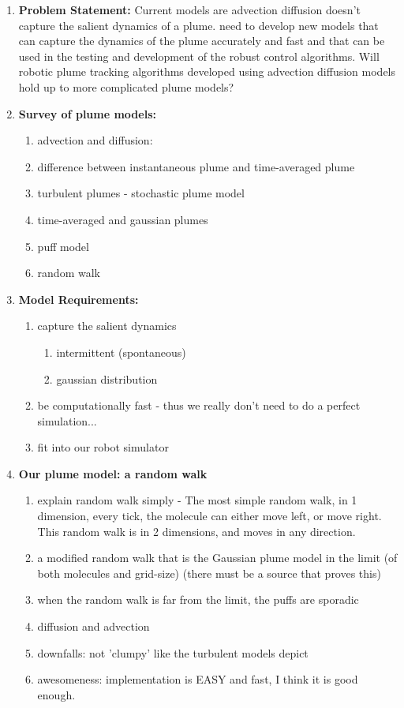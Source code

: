 \documentclass[11pt]{article} %
\begin{document}
\begin{enumerate}

\item {\bf Problem Statement:} Current models are advection diffusion doesn't capture the salient dynamics of a plume.   need to develop new models that can capture the dynamics of the plume accurately and fast and that can be used in the testing and development of the robust control algorithms.   Will robotic plume tracking algorithms developed using advection diffusion models hold up to more complicated plume models?

\item {\bf  Survey of plume models:} %
\begin{enumerate}
	\item advection  and diffusion: 
	\item difference between instantaneous plume and time-averaged plume
	\item turbulent plumes - stochastic plume model
	\item time-averaged and gaussian plumes
	\item puff model
	\item random walk
\end{enumerate}



\item {\bf Model Requirements:}
\begin{enumerate}
	\item capture the salient dynamics 
	\begin{enumerate}
		\item intermittent (spontaneous)
		\item gaussian distribution
	\end{enumerate}
	\item be computationally fast - thus we really don't need to do a perfect simulation... 
	\item fit into our robot simulator
\end{enumerate}

\item {\bf Our plume model: a random walk}
\begin{enumerate}
	\item explain random walk simply - The most simple random walk, in 1 dimension, every tick, the molecule can either move left, or move right.  This random walk is in 2 dimensions, and moves in any direction.
	\item a modified random walk that is the Gaussian plume model in the limit (of both molecules and grid-size) (there must be a source that proves this) 
	\item when the random walk is far from the limit, the puffs are sporadic
	\item diffusion and advection
	\item downfalls:  not 'clumpy' like the turbulent models depict
	\item awesomeness: implementation is EASY and fast,  I think it is good enough.
\end{enumerate}


\end{enumerate}
\end{document}
